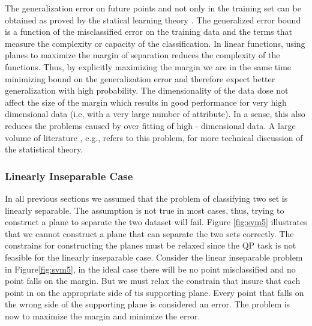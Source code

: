 The generalization error on future points and not only in the training set can be obtained as proved by the statical learning theory \cite{BennettSVMP2000}.  The generalized error bound is a function of the misclassified error on the training data and the terms that measure the complexity or capacity of the classification. In linear functions, using planes to maximize the margin of separation reduces the complexity of the functions. Thus, by explicitly maximizing the margin we are in the same time  minimizing bound on the generalization error and therefore expect better generalization with high probability. The dimensionality of the data dose not affect the size of the margin which   results in good performance  for very high dimensional data (i.e, with a very large number of attribute). In a sense, this also reduces the  problems caused by over fitting of high - dimensional data.  A large volume of literature  , e.g., \cite{bookSVMoverfit11,statisticalSVM1} refers to this problem,  for more technical discussion of the   statistical theory. 


\subsubsection{Linearly Inseparable Case}
In all previous sections we assumed that the problem of classifying two set is linearly separable. The assumption is not true in most cases, thus, trying to construct a plane to separate the two dataset will fail. Figure \ref{fig:svm5} illustrates that we cannot construct a plane that can separate the two sets correctly. The constrains for constructing the planes must be relaxed since the QP task is not feasible for the linearly inseparable case.  Consider the linear inseparable problem in Figure\ref{fig:svm5}, in the ideal case there will be no point misclassified and no point falls on the margin. But we must relax the constrain that insure that each point in on the appropriate side of tis supporting plane. Every point that falls on the wrong side of the supporting plane is considered an error. The problem is now to maximize the margin and minimize the error.  
 
